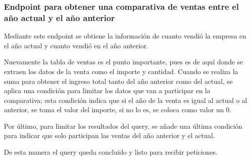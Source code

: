 \subsubsection{Endpoint para obtener una comparativa de ventas entre el año actual y el año anterior}
Mediante este endpoint se obtiene la información de cuanto vendió la empresa en el año actual y cuanto vendió en el año anterior.

Nuevamente la tabla de ventas es el punto importante, pues es de aquí donde se extraen los datos de la venta como el importe y cantidad. Cuando se realiza la suma para obtener el ingreso total tanto del año anterior como del actual, se aplica una condición para limitar los datos que van a participar en la comparativa; esta condición indica que si el año de la venta es igual al actual o al anterior, se toma el valor del importe, si no lo es, se coloca como valor un 0.

Por último, para limitar los resultados del query, se añade una última condición para indicar que solo participan las ventas del año anterior y el actual.

De esta manera el query queda concluido y listo para recibir peticiones.